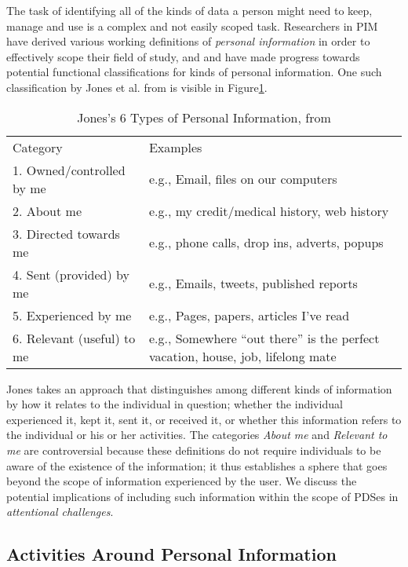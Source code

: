 \documentclass[graybox]{svmult}
\begin{document}
The task of identifying all of the kinds of data a person might need to keep, manage and use is a complex and not easily scoped task.  Researchers in PIM have derived various working definitions of \emph{personal information} in order to effectively scope their field of study, and and have made progress towards potential functional classifications for kinds of personal information. One such classification by Jones et al. from \cite{kftf} is visible in Figure\ref{fig:jonestype}.

\begin{table}
\begin{tabular}{p{4cm} p{8cm}}
Category & Examples \\
1. Owned/controlled by me & e.g., Email, files on our computers  \\
2. About me	& e.g., my credit/medical history, web history \\
3. Directed towards me & e.g., phone calls, drop ins, adverts, popups \\
4. Sent (provided) by me & e.g.,  Emails, tweets, published reports  \\
5. Experienced by me & e.g.,  Pages, papers, articles I’ve read \\
6. Relevant (useful) to me	& e.g.,  Somewhere ``out there'' is the perfect vacation, house, job, lifelong mate \\
\end{tabular}
\caption{Jones's 6 Types of Personal Information, from \cite{kftf}}
\label{fig:jonestype}
\end{table}

Jones takes an approach that distinguishes among different kinds of information by how it relates to the individual in question; whether the individual experienced it, kept it, sent it, or received it, or whether this information refers to the individual or his or her activities.  The categories \emph{About me} and \emph{Relevant to me} are controversial because these definitions do not require individuals to be aware of the existence of the information; it thus establishes a sphere that goes beyond the scope of information experienced by the user.  We discuss the potential implications of including such information within the scope of PDSes in \emph{attentional challenges}. 


\subsection{Activities Around Personal Information}
\end{document}
